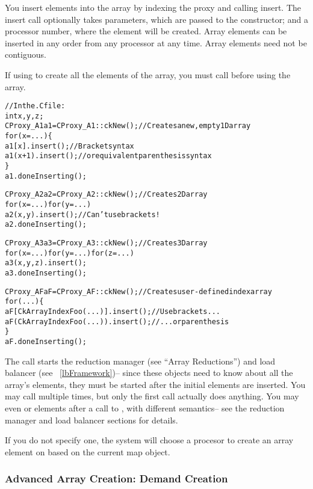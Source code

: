 You insert elements into the array by indexing the proxy
and calling insert.  The insert call optionally takes 
parameters, which are passed to the constructor; and a
processor number, where the element will be created.
Array elements can be inserted in any order from 
any processor at any time.  Array elements need not 
be contiguous.

If using  to create all the elements of the array,
you must call  before using
the array.

\begin{alltt}
//In the .C file:
int x,y,z;
CProxy_A1 a1=CProxy_A1::ckNew();  //Creates a new, empty 1D array
for (x=...) \{
   a1[x  ].insert();  //Bracket syntax
   a1(x+1).insert();  // or equivalent parenthesis syntax
\}
a1.doneInserting();

CProxy_A2 a2=CProxy_A2::ckNew();   //Creates 2D array
for (x=...) for (y=...)
   a2(x,y).insert();  //Can't use brackets!
a2.doneInserting();

CProxy_A3 a3=CProxy_A3::ckNew();   //Creates 3D array
for (x=...) for (y=...) for (z=...)
   a3(x,y,z).insert();
a3.doneInserting();

CProxy_AF aF=CProxy_AF::ckNew();   //Creates user-defined index array
for (...) \{
   aF[CkArrayIndexFoo(...)].insert(); //Use brackets...
   aF(CkArrayIndexFoo(...)).insert(); //  ...or parenthesis
\}
aF.doneInserting();

\end{alltt}

The  call starts the reduction manager (see ``Array
Reductions'') and load balancer (see ~\ref{lbFramework})-- since
these objects need to know about all the array's elements, they
must be started after the initial elements are inserted.
You may call  multiple times, but only the first
call actually does anything.  You may even  or 
elements after a call to , with different semantics-- 
see the reduction manager and load balancer sections for details.

If you do not specify one, the system will choose a procesor to 
create an array element on based on the current map object.



\subsubsection{Advanced Array Creation: Demand Creation}

